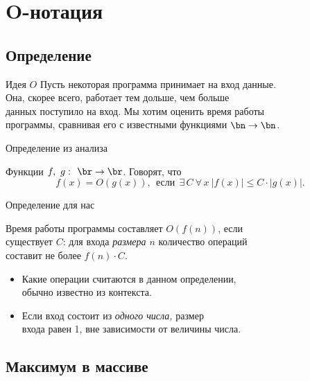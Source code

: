 \section{O-нотация}

\subsection{Определение}

\begin{frame}{Идея \(O\)}
	Пусть некоторая программа принимает на вход данные. \\
	Она, скорее всего, работает тем дольше, чем больше \\
	данных поступило на вход. Мы хотим оценить время работы \\
	программы, сравнивая его с известными функциями \(\bn \to \bn\).
\end{frame}


\begin{frame}{Определение из анализа}
\begin{defn}
	Функции \(f,\ g\,\colon\ \br \to \br\). Говорят, что
		\[f(x) = O(g(x)),\ \ \text{если}\ \ \exists\,C\ \forall\,x\ 
			|f(x)| \le C \cdot |g(x)|. \]
\end{defn}
\end{frame}


\begin{frame}{Определение для нас} \ \\
\begin{defn}
	Время работы программы составляет \(O(f(n))\), если \\
	существует \(C\): для входа {\it размера \(n\)} количество операций \\
	составит не более \(f(n) \cdot C\).
\end{defn}

\begin{itemize}
	\item Какие операции считаются в данном определении, \\
	      обычно известно из контекста.
	\item Если вход состоит из {\it одного числа,} размер \\
	      входа равен 1, вне зависимости от величины числа.
\end{itemize}
\end{frame}

\subsection{Максимум в массиве}

